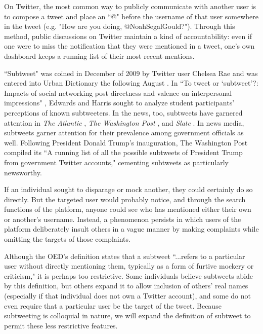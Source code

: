 \documentclass[11pt, twoside, reqno]{book}
\begin{document}
On Twitter, the most common way to publicly communicate with another user is to compose a tweet and place an ``@" before the username of that user somewhere in the tweet (e.g. "How are you doing, @NoahSegalGould?"). Through this method, public discussions on Twitter maintain a kind of accountability: even if one were to miss the notification that they were mentioned in a tweet, one's own dashboard keeps a running list of their most recent mentions.

``Subtweet" was coined in December of 2009 by Twitter user Chelsea Rae \cite{first_subtweet} and was entered into Urban Dictionary the following August \cite{urban_dictionary}. In ``To tweet or ‘subtweet’?: Impacts of social networking post directness and valence on interpersonal impressions" \cite{subtweets_communications}, Edwards and Harris sought to analyze student participants' perceptions of known subtweeters. In the news, too, subtweets have garnered attention in \textit{The Atlantic} \cite{the_atlantic}, \textit{The Washington Post} \cite{the_washington_post}, and \textit{Slate} \cite{slate}. In news media, subtweets garner attention for their prevalence among government officials as well. Following President Donald Trump's inauguration, The Washington Post compiled its ``A running list of all the possible subtweets of President Trump from government Twitter accounts," \cite{the_washington_post_trump} cementing subtweets as particularly newsworthy.

If an individual sought to disparage or mock another, they could certainly do so directly. But the targeted user would probably notice, and through the search functions of the platform, anyone could see who has mentioned either their own or another's username. Instead, a phenomenon persists in which users of the platform deliberately insult others in a vague manner by making complaints while omitting the targets of those complaints.

Although the OED's definition states that a subtweet ``...refers to a particular user without directly mentioning them, typically as a form of furtive mockery or criticism," it is perhaps too restrictive. Some individuals believe subtweets abide by this definition, but others expand it to allow inclusion of others' real names (especially if that individual does not own a Twitter account), and some do not even require that a particular user be the target of the tweet. Because subtweeting is colloquial in nature, we will expand the definition of subtweet to permit these less restrictive features.
\end{document}
